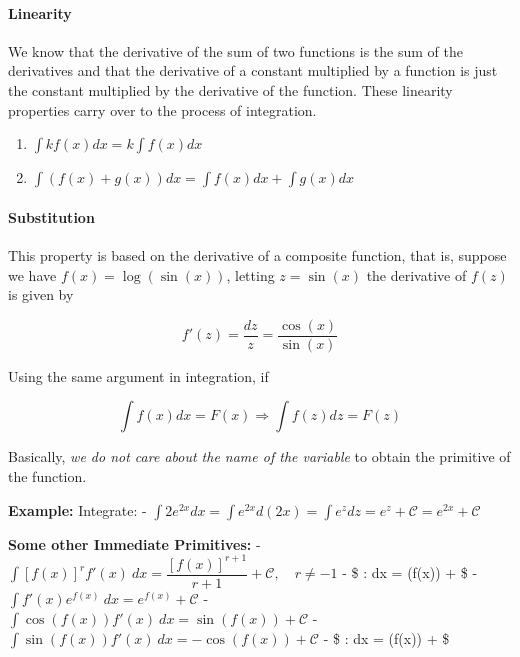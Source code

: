 \documentclass[11pt]{article}
\providecommand{\tightlist}{%
      \setlength{\itemsep}{0pt}\setlength{\parskip}{0pt}}
\begin{document}
\hypertarget{linearity}{%
\paragraph{Linearity}\label{linearity}}

We know that the derivative of the sum of two functions is the sum of
the derivatives and that the derivative of a constant multiplied by a
function is just the constant multiplied by the derivative of the
function. These linearity properties carry over to the process of
integration.

\begin{enumerate}
\def\labelenumi{\arabic{enumi}.}
\tightlist
\item
  \(\int k f(x) dx = k \int f(x) dx\)
\item
  \(\int (f(x) + g(x)) dx = \int f(x) dx + \int g(x) dx\)
\end{enumerate}

\hypertarget{substitution}{%
\paragraph{Substitution}\label{substitution}}

This property is based on the derivative of a composite function, that
is, suppose we have \(f(x) = \log(\sin(x))\), letting \(z = \sin(x)\)
the derivative of \(f(z)\) is given by

\[
f'(z) = \frac{dz}{z} = \frac{\cos(x)}{\sin(x)}
\]

Using the same argument in integration, if

\[
\int f(x) dx = F(x) \Rightarrow \int f(z) dz = F(z)
\]

Basically, \emph{we do not care about the name of the variable} to
obtain the primitive of the function.

\textbf{Example:} Integrate: -
\(\int 2 e^{2x} dx = \int e^{2x}d(2x) = \int e^z dz = e^z + \mathcal{C} = e^{2x} + \mathcal{C}\)

\textbf{Some other Immediate Primitives:} -
\(\displaystyle \int [f(x)]^r f'(x) \: dx = \dfrac{[f(x)]^{r+1}}{r+1} + \mathcal{C}, \quad r \neq -1\)
- \$\displaystyle  \int {} : dx = \ln(f(x)) +
 \$ -
\(\displaystyle \int f'(x) e^{f(x)} \: dx = e^{f(x)} + \mathcal{C}\) -
\(\displaystyle \int \cos(f(x))f'(x) \: dx = \sin(f(x)) + \mathcal{C}\)
-
\(\displaystyle \int \sin(f(x)) f'(x) \: dx = -\cos(f(x)) + \mathcal{C}\)
- \$\displaystyle \int {} : dx = \arctan(f(x)) +
 \$
\end{document}
